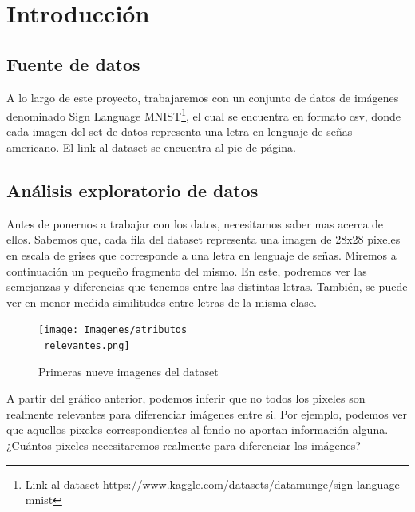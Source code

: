 \documentclass[10pt,a4paper]{article}
\begin{document}
\maketitle

\section{Introducción}  \vspace{0.1cm}

\subsection{Fuente de datos} \vspace{0.2cm}

A lo largo de este proyecto, trabajaremos con un conjunto de datos de imágenes denominado Sign
Language MNIST\footnote{Link al dataset https://www.kaggle.com/datasets/datamunge/sign-language-mnist}, el cual se encuentra en formato csv, donde cada imagen del set de datos representa una letra en lenguaje de señas americano. El link al dataset se encuentra al pie de página.

\subsection{Análisis exploratorio de datos}  \vspace{0.2cm}

Antes de ponernos a trabajar con los datos, necesitamos saber mas acerca de ellos. Sabemos que, cada fila del dataset representa una imagen de 28x28 pixeles en escala de grises que corresponde a una letra en lenguaje de señas. Miremos a continuación un pequeño fragmento del mismo. En este, podremos ver las semejanzas y diferencias que tenemos entre las distintas letras. También, se puede ver en menor medida similitudes entre letras de la misma clase.

 \vspace{0.2cm}

\begin{figure}[h]
  \centering
  \texttt{[image: Imagenes/atributos\\\_relevantes.png]}
  \caption{Primeras nueve imagenes del dataset}
  \label{fig:Tabla 1}
\end{figure}

 \vspace{0.2cm}

A partir del gráfico anterior, podemos inferir que no todos los pixeles son realmente relevantes para diferenciar imágenes entre si. Por ejemplo, podemos ver
que aquellos pixeles correspondientes al fondo no aportan información alguna. ¿Cuántos pixeles necesitaremos realmente para diferenciar las imágenes? \vspace{0.05cm}
\end{document}
